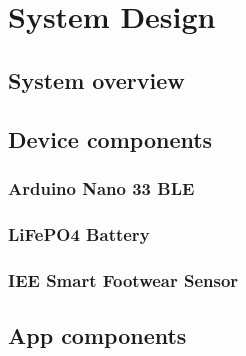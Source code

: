 \chapter{System Design}
\label{chap:systemdesign}

\section{System overview}


\section{Device components}
\subsection{Arduino Nano 33 BLE}

\subsection{LiFePO4 Battery}

\subsection{IEE Smart Footwear Sensor}

\section{App components}
